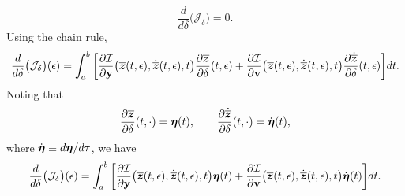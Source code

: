 \documentclass[3p,computermodern,10pt]{elsarticle}
\begin{document}
\begin{appendices}
\begin{equation}
\frac{d}{d\delta} \big( \mathcal{J}_{\delta} \big)=  0.
\end{equation}
Using the chain rule,
$$ 
\frac{d}{d\delta} \big( \mathcal{J}_{\delta} \big)(\epsilon)= 
\int_a^b \bigg[ \frac{\partial \mathcal{I}  }{\partial \mathbf{y} } \big(\overline{\boldsymbol z}(t,\epsilon),\dot{\overline{\boldsymbol z}}(t,\epsilon) ,t\big) \frac{\partial \overline{\boldsymbol z} }{\partial \delta}(t,\epsilon)  + \frac{\partial \mathcal{I}}{\partial \mathbf{{v}} } \big(\overline{\boldsymbol z}(t,\epsilon),\dot{\overline{\boldsymbol z}}(t,\epsilon) ,t \big) \frac{\partial \dot{\overline{\boldsymbol z}}}{\partial \delta} (t,\epsilon)\bigg]dt . $$
Noting that
$$\frac{\partial \overline{\boldsymbol z}}{\partial \delta} (t,\cdot)= \boldsymbol \eta(t), \qquad \frac{\partial \dot{\overline{\boldsymbol z}} }{\partial \delta}(t,\cdot)= \dot{\boldsymbol \eta}(t),$$
where $\dot{\boldsymbol \eta} \equiv d \boldsymbol \eta / d\tau$, 
we have
$$
\frac{d}{d\delta} \big( \mathcal{J}_{\delta} \big)(\epsilon)
= \int_a^b \bigg[ \frac{\partial \mathcal{I}  }{\partial \mathbf{y} } \big(\overline{\boldsymbol z}(t,\epsilon),\dot{\overline{\boldsymbol z}}(t,\epsilon),t \big) \boldsymbol \eta(t)  + \frac{\partial \mathcal{I}}{\partial \mathbf{{v}} } \big(\overline{\boldsymbol z}(t,\epsilon),\dot{\overline{\boldsymbol z}}(t,\epsilon) ,t \big) \dot{\boldsymbol \eta}(t) \bigg]dt. $$

\end{appendices}
\end{document}
